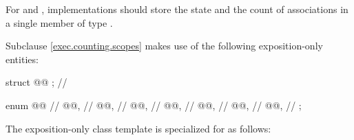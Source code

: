 \pnum
\recommended
For  and ,
implementations should store the state and the count of associations
in a single member of type .

\pnum
Subclause \ref{exec.counting.scopes} makes use of
the following exposition-only entities:

\begin{codeblock}
struct @@ {};     // \expos

enum @@ {     // \expos
  @@,                   // \expos
  @@,                     // \expos
  @@,                   // \expos
  @@,         // \expos
  @@,       // \expos
  @@,        // \expos
  @@,                   // \expos
};
\end{codeblock}

\pnum
The exposition-only class template 
is specialized for  as follows:

